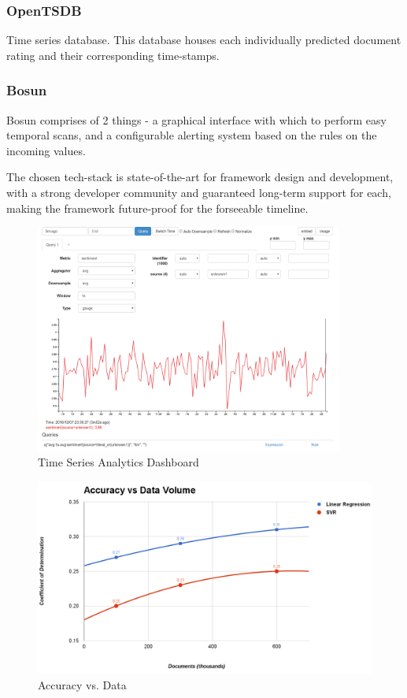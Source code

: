 \documentclass[conference]{IEEEtran}
\begin{document}
        \subsubsection{OpenTSDB}
            Time series database. This database houses each individually predicted document rating and their corresponding time-stamps\cite{opentsdb}.
        
        \subsubsection{Bosun}
            Bosun comprises of 2 things - a graphical interface with which to perform easy temporal scans, and a configurable alerting system based on the rules on the incoming values\cite{bosun_repo}. 

        The chosen tech-stack is state-of-the-art for framework design and development, with a strong developer community and guaranteed long-term support for each, making the framework future-proof for the forseeable timeline.

\begin{figure}[ht] \label{fig:time-series-analytics-dashboard}
    \centering
    \includegraphics[width=0.9\textwidth]{images/bosun_dash_1.png}
    \caption{Time Series Analytics Dashboard}
\end{figure}

\begin{figure}[ht] \label{fig:accuracy-v-data}
    \centering
    \includegraphics[width=\textwidth]{images/accuracy-vs-data.png}
    \caption{Accuracy vs. Data}
\end{figure}
\end{document}
